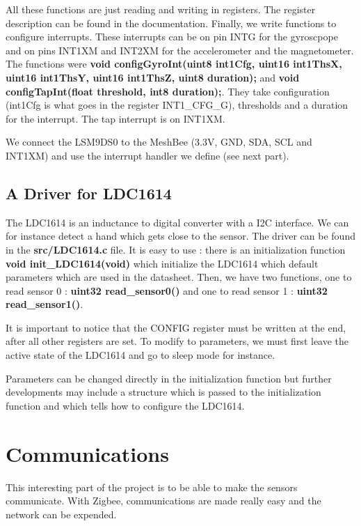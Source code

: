 All these functions are just reading and writing in registers. The register description can be found in the documentation. Finally, we write functions to configure interrupts. These interrupts can be on pin INTG for the gyroscpope and on pins INT1XM and INT2XM for the accelerometer and the magnetometer. The functions were \textbf{void configGyroInt(uint8 int1Cfg, uint16 int1ThsX, uint16 int1ThsY, uint16 int1ThsZ, uint8 duration);} and \textbf{void configTapInt(float threshold, int8 duration);}. They take configuration (int1Cfg is what goes in the register INT1\_CFG\_G), thresholds and a duration for the interrupt. The tap interrupt is on INT1XM.

We connect the LSM9DS0 to the MeshBee (3.3V, GND, SDA, SCL and INT1XM) and use the interrupt handler we define (see next part).

\subsection{A Driver for LDC1614}

The LDC1614 is an inductance to digital converter with a I2C interface. We can for instance detect a hand which gets close to the sensor. The driver can be found in the \textbf{src/LDC1614.c} file. It is easy to use : there is an initialization function \textbf{void init\_LDC1614(void)} which initialize the LDC1614 which default parameters which are used in the datasheet. Then, we have two functions, one to read sensor 0 : \textbf{uint32 read\_sensor0()} and one to read sensor 1 : \textbf{uint32 read\_sensor1()}.

It is important to notice that the CONFIG register must be written at the end, after all other registers are set. To modify to parameters, we must first leave the active state of the LDC1614 and go to sleep mode for instance.

Parameters can be changed directly in the initialization function but further developments may include a structure which is passed to the initialization function and which tells how to configure the LDC1614.

\section{Communications}

This interesting part of the project is to be able to make the sensors communicate. With Zigbee, communications are made really easy and the network can be expended.

